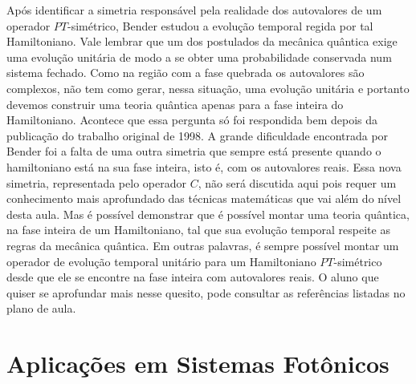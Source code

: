\documentclass{article}
\begin{document}
Após identificar a simetria responsável pela realidade dos autovalores de um operador $PT$-simétrico, Bender estudou a evolução temporal regida por tal Hamiltoniano. Vale lembrar que um dos postulados da mecânica quântica exige uma evolução unitária de modo a se obter uma probabilidade conservada num sistema fechado. Como na região com a fase quebrada os autovalores são complexos, não tem como gerar, nessa situação, uma evolução unitária e portanto devemos construir uma teoria quântica apenas para a fase inteira do Hamiltoniano. Acontece que essa pergunta só foi respondida bem depois da publicação do trabalho original de 1998. A grande dificuldade encontrada por Bender foi a falta de uma outra simetria que sempre está presente quando o hamiltoniano está na sua fase inteira, isto é, com os autovalores reais. Essa nova simetria, representada pelo operador $C$, não será discutida aqui pois requer um conhecimento mais aprofundado das técnicas matemáticas que vai além do nível desta aula. Mas é possível demonstrar que é possível montar uma teoria quântica, na fase inteira de um Hamiltoniano, tal que sua evolução temporal respeite as regras da mecânica quântica. Em outras palavras, é sempre possível montar um operador de evolução temporal unitário para um Hamiltoniano $PT$-simétrico desde que ele se encontre na fase inteira com autovalores reais. O aluno que quiser se aprofundar mais nesse quesito, pode consultar as referências listadas no plano de aula. 




\section{Aplicações em Sistemas Fotônicos}
\end{document}
